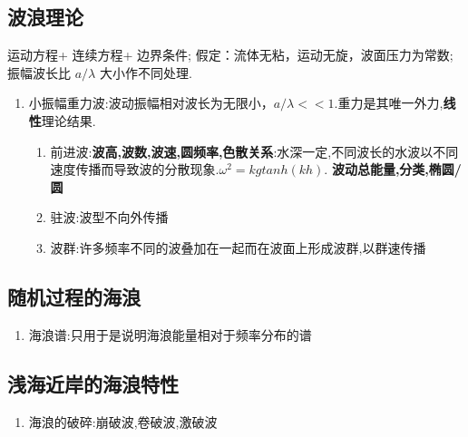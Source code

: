 	\subsection{波浪理论}
		运动方程+ 连续方程+ 边界条件;
		假定：流体无粘，运动无旋，波面压力为常数;
		振幅波长比 $a/\lambda$ 大小作不同处理.
		\begin{enumerate}
			\item 小振幅重力波:波动振幅相对波长为无限小，$a/\lambda<<1$.重力是其唯一外力,\textbf{线性}理论结果.
				\begin{enumerate}
					\item 前进波:\textbf{波高,波数,波速,圆频率,色散关系}:水深一定,不同波长的水波以不同速度传播而导致波的分散现象.$\omega^2 = kgtanh(kh)$. \textbf{波动总能量,分类,椭圆/圆}
					\item 驻波:波型不向外传播
					\item 波群:许多频率不同的波叠加在一起而在波面上形成波群,以群速传播
									
				\end{enumerate}
		\end{enumerate}
		
	\subsection{随机过程的海浪}
		\begin{enumerate}
			\item 海浪谱:只用于是说明海浪能量相对于频率分布的谱
		\end{enumerate}
		
	\subsection{浅海近岸的海浪特性}
		\begin{enumerate}
 			\item 海浪的破碎:崩破波,卷破波,激破波
		\end{enumerate}
	
